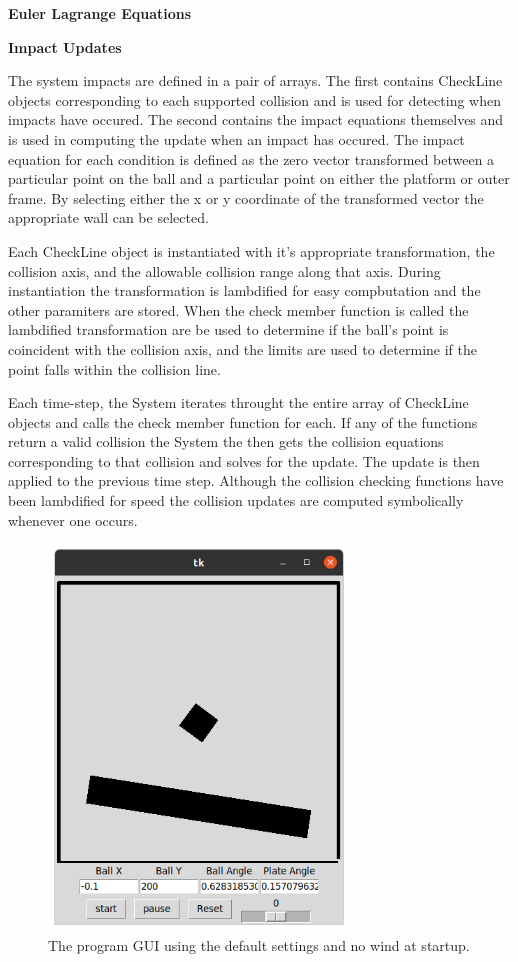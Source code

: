 \documentclass[12pt]{article}
\begin{document}
\textbf{Euler Lagrange Equations}

\noindent
\textbf{Impact Updates}

The system impacts are defined in a pair of arrays. The first contains CheckLine objects corresponding to each supported collision and  is used for detecting when impacts have occured. The second contains the impact equations themselves and is used in computing the update when an impact has occured.  The impact equation for each condition is defined as the zero vector transformed between a particular point on the ball and a particular point on either the platform or outer frame. By selecting either the x or y coordinate of the transformed vector the appropriate wall can be selected. 

Each CheckLine object is instantiated with it's appropriate transformation, the collision axis, and the allowable collision range along that axis. During instantiation the transformation is lambdified for easy compbutation and the other paramiters are stored. When the check member function is called the lambdified transformation are be used to determine if the ball's point is coincident with the collision axis, and the limits are used to determine if the point falls within the collision line. 

Each time-step, the System iterates throught the entire array of CheckLine objects and calls the check member function for each. If any of the functions return a valid collision the System the then gets the collision equations corresponding to that collision and solves for the update. The update is then applied to the previous time step.  Although the collision checking functions have been lambdified for speed the collision updates are computed symbolically whenever one occurs. 
\begin{figure}[h]
\centering
\includegraphics[width=8cm]{gui_no_motion.png}
\caption{The program GUI using the default settings and no wind at startup.}
\label{gui_default}

\end{figure}
\end{document}
